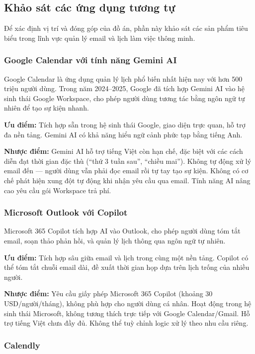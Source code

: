 \documentclass[../DoAn.tex]{subfiles}
\begin{document}
\subsection{Khảo sát các ứng dụng tương tự}

Để xác định vị trí và đóng góp của đồ án, phần này khảo sát các sản phẩm tiêu biểu trong lĩnh vực quản lý email và lịch làm việc thông minh.

\subsubsection{Google Calendar với tính năng Gemini AI}

Google Calendar là ứng dụng quản lý lịch phổ biến nhất hiện nay với hơn 500 triệu người dùng. Trong năm 2024--2025, Google đã tích hợp Gemini AI vào hệ sinh thái Google Workspace, cho phép người dùng tương tác bằng ngôn ngữ tự nhiên để tạo sự kiện nhanh.

\textbf{Ưu điểm:} Tích hợp sẵn trong hệ sinh thái Google, giao diện trực quan, hỗ trợ đa nền tảng. Gemini AI có khả năng hiểu ngữ cảnh phức tạp bằng tiếng Anh.

\textbf{Nhược điểm:} Gemini AI hỗ trợ tiếng Việt còn hạn chế, đặc biệt với các cách diễn đạt thời gian đặc thù (``thứ 3 tuần sau'', ``chiều mai''). Không tự động xử lý email đến — người dùng vẫn phải đọc email rồi tự tay tạo sự kiện. Không có cơ chế phát hiện xung đột tự động khi nhận yêu cầu qua email. Tính năng AI nâng cao yêu cầu gói Workspace trả phí.

\subsubsection{Microsoft Outlook với Copilot}

Microsoft 365 Copilot tích hợp AI vào Outlook, cho phép người dùng tóm tắt email, soạn thảo phản hồi, và quản lý lịch thông qua ngôn ngữ tự nhiên.

\textbf{Ưu điểm:} Tích hợp sâu giữa email và lịch trong cùng một nền tảng. Copilot có thể tóm tắt chuỗi email dài, đề xuất thời gian họp dựa trên lịch trống của nhiều người.

\textbf{Nhược điểm:} Yêu cầu giấy phép Microsoft 365 Copilot (khoảng 30 USD/người/tháng), không phù hợp cho người dùng cá nhân. Hoạt động trong hệ sinh thái Microsoft, không tương thích trực tiếp với Google Calendar/Gmail. Hỗ trợ tiếng Việt chưa đầy đủ. Không thể tuỳ chỉnh logic xử lý theo nhu cầu riêng.

\subsubsection{Calendly}
\end{document}
